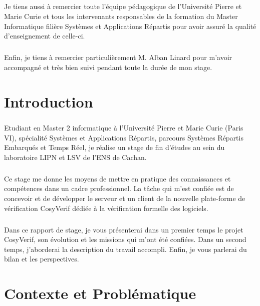 \documentclass{report}
\begin{document}
\paragraph{}
Je tiens aussi à remercier toute l'équipe pédagogique de l'Université Pierre et Marie Curie et tous les intervenants 
responsables de la formation du Master Informatique filière Systèmes et Applications Répartis pour avoir assuré la qualité
d’enseignement de celle-ci.

\paragraph{}
Enfin, je tiens à remercier particulièrement M. Alban Linard pour m'avoir accompagné et très bien suivi pendant toute la 
durée de mon stage.


\chapter*{Introduction}

\paragraph{}
Etudiant en Master 2 informatique à l’Université Pierre et Marie Curie (Paris VI), spécialité Systèmes et Applications 
Répartis, parcours Systèmes Répartis Embarqués et Temps Réel, je réalise un stage de fin d'études au sein du laboratoire 
LIPN et LSV de l'ENS de Cachan. 

\paragraph{}
Ce stage me donne les moyens de mettre en pratique des connaissances et compétences dans un cadre professionnel. La 
tâche qui m'est confiée est de concevoir et de développer le serveur et un client de la nouvelle plate-forme de vérification
 CosyVerif dédiée à la vérification formelle des logiciels.

\paragraph{}
Dans ce rapport de stage, je vous présenterai dans un premier temps le projet CosyVerif, son évolution et les missions 
qui m'ont été confiées.  Dans un second temps, j'aborderai la description du travail accompli. Enfin, je vous parlerai du
bilan et les perspectives.


\chapter{Contexte et Problématique}
\end{document}
